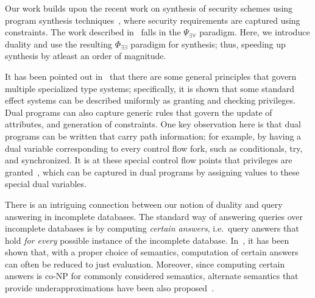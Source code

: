 \documentclass[preprint]{sig-alternate-05-2015}
\begin{document}
Our work builds upon the recent work on synthesis of security schemes
using program synthesis techniques~\cite{TGD15:CADE}, where security
requirements are captured using constraints.
The work described in~\cite{TGD15:CADE} falls in the $\Psi_{\exists\forall}$
paradigm. Here, we introduce duality and use the resulting 
$\Phi_{\exists\exists}$ paradigm for synthesis; thus, speeding up synthesis
by atleast an order of magnitude.

It has been pointed out in~\cite{DBLP:conf/tldi/MarinoM09}
that there are some general principles that govern multiple
specialized type systems; specifically, it is shown that
some standard effect systems can be described uniformly as
granting and checking privileges.
Dual programs can also capture generic rules that
govern the update of attributes, and generation of
constraints. One key observation here is that
dual programs can be written that carry path information;
for example, by having 
a dual variable corresponding to every control flow fork, such
as conditionals, try, and synchronized.
It is at these special control flow points that
privileges are granted~\cite{DBLP:conf/tldi/MarinoM09,DBLP:journals/toplas/AbadiFF06}, 
which can be captured in dual programs by 
assigning values to these special dual variables.

There is an intriguing connection between our notion of duality 
and query answering in incomplete databases. 
The standard way of answering queries over incomplete
databases is by computing {\em certain answers}, i.e.\ 
query answers that hold {\em for every} possible instance
of the incomplete database. In~\cite{Libkin14},
it has been shown that, with a proper choice of semantics,
computation of certain answers can often be reduced 
to just evaluation. 
Moreover, since computing certain answers is co-NP
for commonly considered semantics, alternate semantics
that provide underapproximations have been also proposed~\cite{Libkin15}.
\end{document}
